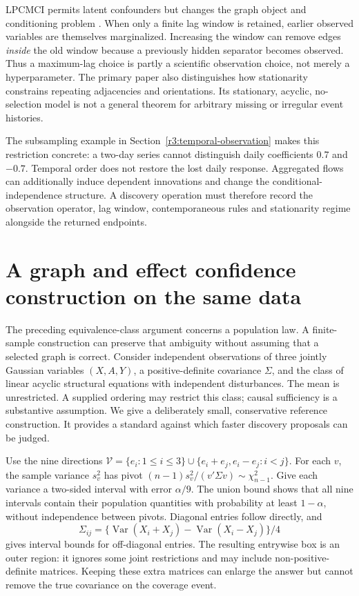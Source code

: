 LPCMCI permits latent confounders but changes the graph object and
conditioning problem \citep[Sections 2.1--2.3]{gerhardus2020}.
When only a finite lag window is retained, earlier observed variables
are themselves marginalized. Increasing the window can remove edges
\emph{inside} the old window because a previously hidden separator
becomes observed. Thus a maximum-lag choice is partly a scientific
observation choice, not merely a hyperparameter. The primary paper also
distinguishes how stationarity constrains repeating adjacencies and
orientations. Its stationary, acyclic, no-selection model is not a
general theorem for arbitrary missing or irregular event histories.

The subsampling example in Section~\ref{r3:temporal-observation} makes this
restriction concrete: a two-day series cannot distinguish daily
coefficients $0.7$ and $-0.7$. Temporal order does not restore the lost
daily response. Aggregated flows can additionally induce dependent
innovations and change the conditional-independence structure. A
discovery operation must therefore record the observation operator,
lag window, contemporaneous rules and stationarity regime alongside
the returned endpoints.



\section{A graph and effect confidence construction on the same data}
\label{s4:graph-confidence}
The preceding equivalence-class argument concerns a population law. A
finite-sample construction can preserve that ambiguity without assuming
that a selected graph is correct. Consider independent observations of
three jointly Gaussian variables $(X,A,Y)$, a positive-definite covariance
$\Sigma$, and the class of linear acyclic structural equations with
independent disturbances. The mean is unrestricted. A supplied ordering
may restrict this class; causal sufficiency is a substantive assumption.
We give a deliberately small, conservative reference construction. It
provides a standard against which faster discovery proposals can be judged.

Use the nine directions
$\mathcal V=\{e_i:1\le i\le3\}\cup
\{e_i+e_j,e_i-e_j:i<j\}$. For each $v$, the sample variance $s_v^2$
has pivot $(n-1)s_v^2/(v'\Sigma v)\sim\chi^2_{n-1}$. Give each
variance a two-sided interval with error $\alpha/9$. The union bound
shows that all nine intervals contain their population quantities with
probability at least $1-\alpha$, without independence between pivots.
Diagonal entries follow directly, and
\[
 \Sigma_{ij}=\{\operatorname{Var}(X_i+X_j)
                     -\operatorname{Var}(X_i-X_j)\}/4
\]
gives interval bounds for off-diagonal entries. The resulting entrywise
box is an outer region: it ignores some joint restrictions and may include
non-positive-definite matrices. Keeping these extra matrices can enlarge
the answer but cannot remove the true covariance on the coverage event.


